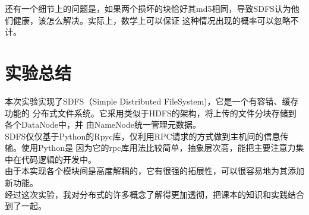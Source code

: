 \documentclass[a4paper]{article}
\begin{document}
还有一个细节上的问题是，如果两个损坏的块恰好其md5相同，导致SDFS认为他们健康，该怎么解决。实际上，数学上可以保证
这种情况出现的概率可以忽略不计。


\section{实验总结}
本次实验实现了SDFS（Simple Distributed FileSystem)，它是一个有容错、缓存功能的
分布式文件系统。它采用类似于HDFS的架构，将上传的文件分块存储到各个DataNode中，并
由NameNode统一管理元数据。\\

SDFS仅仅基于Python的Rpyc库，仅利用RPC请求的方式做到主机间的信息传输。使用Python是
因为它的rpc库用法比较简单，抽象层次高，能把主要注意力集中在代码逻辑的开发中。\\

由于本实现各个模块间是高度解耦的，它有很强的拓展性，可以很容易地为其添加新功能。\\

经过这次实验，我对分布式的许多概念了解得更加透彻，把课本的知识和实践结合到了一起。
\end{document}
